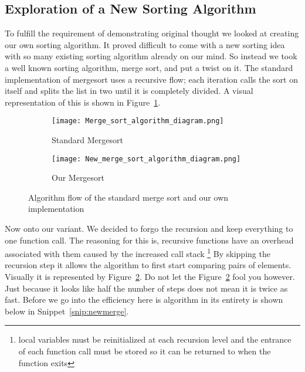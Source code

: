 \documentclass[12pt]{article}
\begin{document}
	
	\subsection{Exploration of a New Sorting Algorithm}
	
	To fulfill the requirement of demonstrating original thought we looked at creating our own sorting algorithm.
	It proved difficult to come with a new sorting idea with so many existing sorting algorithm already on our mind.
	So instead we took a well known sorting algorithm, merge sort, and put a twist on it.
	The standard implementation of mergesort uses a recursive flow; each iteration calls the sort on itself and splits the list in two until it is completely divided.
	A visual representation of this is shown in Figure~\ref{fig:stdmerge}.
	
	
\begin{figure}[H]
	
	\begin{subfigure}{0.5\textwidth}
		\texttt{[image: Merge\_sort\_algorithm\_diagram.png]} 
		\caption{Standard Mergesort}
		\label{fig:stdmerge}
	\end{subfigure}
	\begin{subfigure}{0.5\textwidth}
		\texttt{[image: New\_merge\_sort\_algorithm\_diagram.png]}
		\caption{Our Mergesort}
		\label{fig:newmerge}
	\end{subfigure}
	
	\caption{Algorithm flow of the standard merge sort and our own implementation}
	\label{fig:bothmerge}
\end{figure}
	
	Now onto our variant.
	We decided to forgo the recursion and keep everything to one function call.
	The reasoning for this is, recursive functions have an overhead associated with them caused by the increased call stack \footnote{local variables must be reinitialized at each recursion level and the entrance of each function call must be stored so it can be returned to when the function exits}
	By skipping the recursion step it allows the algorithm to first start comparing pairs of elements.
	Visually it is represented by Figure~\ref{fig:newmerge}.
	Do not let the Figure~\ref{fig:newmerge} fool you however.
	Just because it looks like half the number of steps does not mean it is twice as fast.
	Before we go into the efficiency here is algorithm in its entirety is shown below in Snippet~\ref{snip:newmerge}.
	
\end{document}

